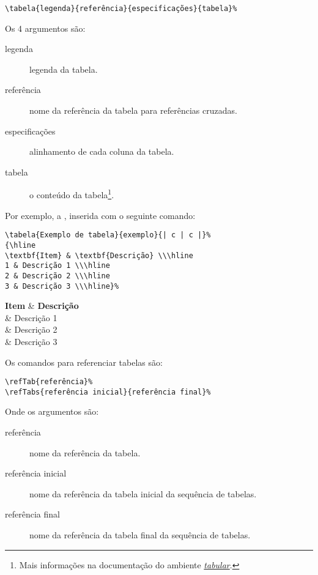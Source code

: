 \begin{verbatim}
\tabela{legenda}{referência}{especificações}{tabela}%
\end{verbatim}

Os 4 argumentos são:
\begin{description}
	\item[legenda] legenda da tabela.
	\item[referência] nome da referência da tabela para referências cruzadas.
	\item[especificações] alinhamento de cada coluna da tabela.
	\item[tabela] o conteúdo da tabela\footnote{Mais informações na documentação do
		ambiente \emph{\href{http://en.wikibooks.org/wiki/LaTeX/Tables}{tabular}}.}.
\end{description}

Por exemplo, a , inserida com o seguinte comando:
\begin{verbatim}
\tabela{Exemplo de tabela}{exemplo}{| c | c |}%
{\hline
\textbf{Item} & \textbf{Descrição} \\\hline
1 & Descrição 1 \\\hline
2 & Descrição 2 \\\hline
3 & Descrição 3 \\\hline}%
\end{verbatim}

%
{\hline
	\textbf{Item} & \textbf{Descrição} \\ & Descrição 1 \\ & Descrição 2 \\ & Descrição 3 \\\hline}%

Os comandos para referenciar tabelas são:

\begin{verbatim}
\refTab{referência}%
\refTabs{referência inicial}{referência final}%
\end{verbatim}

Onde os argumentos são:
\begin{description}
	\item[referência] nome da referência da tabela.
	\item[referência inicial] nome da referência da tabela inicial da sequência de tabelas.
	\item[referência final] nome da referência da tabela final da sequência de tabelas.
\end{description}

